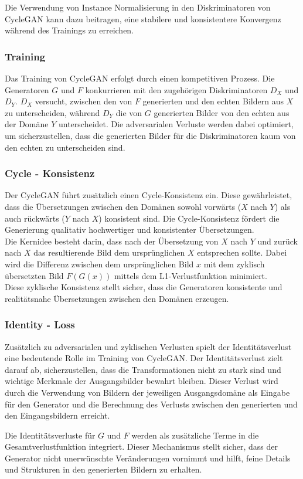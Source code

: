 Die Verwendung von Instance Normalisierung in den Diskriminatoren von CycleGAN kann dazu beitragen, eine stabilere und konsistentere Konvergenz während des Trainings zu erreichen. 

\subsubsection{Training}
Das Training von CycleGAN erfolgt durch einen kompetitiven Prozess. Die Generatoren $G$ und $F$ konkurrieren mit den zugehörigen Diskriminatoren $D_X$ und $D_Y$. $D_X$ versucht, zwischen den von $F$ generierten und den echten Bildern aus $X$ zu unterscheiden, während $D_Y$ die von $G$ generierten Bilder von den echten aus der Domäne $Y$ unterscheidet. Die adversarialen Verluste werden dabei optimiert, um sicherzustellen, dass die generierten Bilder für die Diskriminatoren kaum von den echten zu unterscheiden sind.

\subsubsection{Cycle - Konsistenz}
Der CycleGAN führt zusätzlich einen Cycle-Konsistenz ein. Diese gewährleistet, dass die Übersetzungen zwischen den Domänen sowohl vorwärts ($X$ nach $Y$) als auch rückwärts ($Y$ nach $X$) konsistent sind. Die Cycle-Konsistenz fördert die Generierung qualitativ hochwertiger und konsistenter Übersetzungen.
\\
Die Kernidee besteht darin, dass nach der Übersetzung von $X$ nach $Y$ und zurück nach $X$ das resultierende Bild dem ursprünglichen $X$ entsprechen sollte. Dabei wird die Differenz zwischen dem ursprünglichen Bild $x$ mit dem zyklisch übersetzten Bild $F(G(x))$ mittels dem L1-Verlustfunktion minimiert. 
\\
Diese zyklische Konsistenz stellt sicher, dass die Generatoren konsistente und realitätsnahe Übersetzungen zwischen den Domänen erzeugen.

\subsubsection{Identity - Loss}
Zusätzlich zu adversarialen und zyklischen Verlusten spielt der Identitätsverlust eine bedeutende Rolle im Training von CycleGAN. Der Identitätsverlust zielt darauf ab, sicherzustellen, dass die Transformationen nicht zu stark sind und wichtige Merkmale der Ausgangsbilder bewahrt bleiben. Dieser Verlust wird durch die Verwendung von Bildern der jeweiligen Ausgangsdomäne als Eingabe für den Generator und die Berechnung des Verlusts zwischen den generierten und den Eingangsbildern erreicht.

Die Identitätsverluste für $G$ und $F$ werden als zusätzliche Terme in die Gesamtverlustfunktion integriert. Dieser Mechanismus stellt sicher, dass der Generator nicht unerwünschte Veränderungen vornimmt und hilft, feine Details und Strukturen in den generierten Bildern zu erhalten.